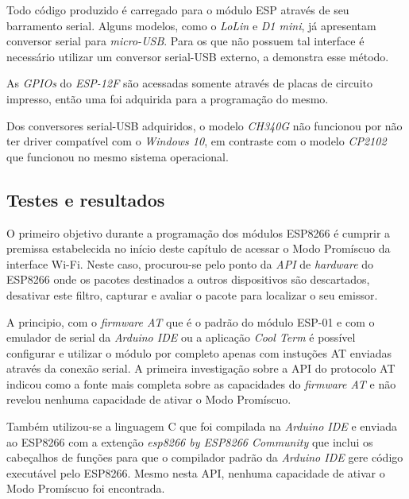Todo código produzido é carregado para o módulo ESP através de seu barramento
serial. Alguns modelos, como o \emph{LoLin} e \emph{D1 mini}, já apresentam conversor serial
para \emph{micro-USB}. Para os que não possuem tal interface é necessário utilizar um
conversor serial-USB externo, a  demonstra esse método.

As \emph{GPIOs} do \emph{ESP-12F} são acessadas somente através de placas
de circuito impresso, então uma foi adquirida para a programação do mesmo.

Dos conversores serial-USB adquiridos, o modelo \emph{CH340G} não funcionou por
não ter driver compatível com o \emph{Windows 10}, em contraste com o modelo
\emph{CP2102}  que funcionou no mesmo sistema operacional.


\subsection{Testes e resultados}
\label{subsec:mercado-esp}

O primeiro objetivo durante a programação dos módulos ESP8266 é cumprir a
premissa  estabelecida no início deste capítulo de acessar o Modo Promíscuo da
interface Wi-Fi. Neste caso, procurou-se pelo ponto da \emph{API} de
\emph{hardware} do ESP8266 onde os pacotes destinados a outros dispositivos são
descartados, desativar este filtro, capturar e avaliar o pacote para localizar o
seu emissor.

A principio, com o \emph{firmware AT} que é o padrão do módulo ESP-01 e com o
emulador de serial da \emph{Arduino IDE} ou a aplicação \emph{Cool Term} é
possível configurar e utilizar o módulo por completo apenas com instuções AT
enviadas através da conexão serial. A primeira investigação sobre a API do protocolo
AT indicou  como a fonte mais completa sobre as capacidades
do \emph{firmware AT} e não revelou nenhuma capacidade de ativar o Modo Promíscuo.

Também utilizou-se a linguagem C que foi compilada na \emph{Arduino IDE} e
enviada ao ESP8266 com a extenção \emph{esp8266 by ESP8266 Community} que inclui
os cabeçalhos de funções para que o compilador padrão da \emph{Arduino IDE} gere
código  executável pelo ESP8266. Mesmo nesta API, nenhuma capacidade de ativar o
Modo Promíscuo foi encontrada.


